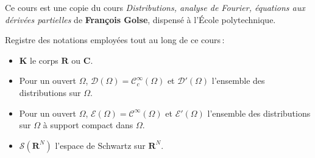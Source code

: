 \documentclass[12pt, a4paper]{article}
\begin{document}


\tableofcontents

\vspace{2cm}

Ce cours est une copie du cours \textit{Distributions, analyse de Fourier, équations aux dérivées partielles} de \textbf{François Golse}, dispensé à l’École polytechnique.

Registre des notations employées tout au long de ce cours :
\begin{itemize}
    \item $\mathbf{K}$ le corps $\mathbf{R}$ ou $\mathbf{C}$.
    \item Pour un ouvert $\Omega$, $\mathcal{D}(\Omega) = \mathcal{C}_c^{\infty}(\Omega)$ et $\mathcal{D}'(\Omega)$ l’ensemble des distributions sur $\Omega$.
    \item Pour un ouvert $\Omega$, $\mathcal{E}(\Omega) = \mathcal{C}^{\infty}(\Omega)$ et $\mathcal{E}'(\Omega)$ l’ensemble des distributions sur $\Omega$ à support compact dans $\Omega$.
    \item $\mathcal{S}(\mathbf{R}^N)$ l’espace de Schwartz sur $\mathbf{R}^N$.
\end{itemize}






\end{document}
